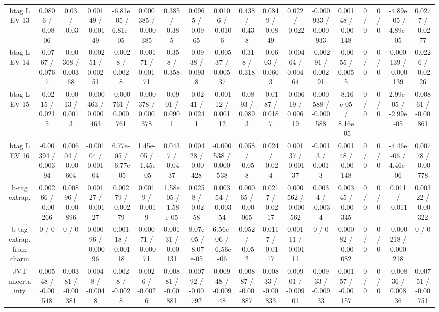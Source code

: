 \documentclass[10pt]{article}
\begin{document}
\begin{table}[htbp]
\begin{center}
\begin{tabular}{|c|c|c|c|c|c|c|c|c|c|c|c|c|c|c|c|c|c|}
  btag L EV 13 & 0.0806 / -0.0806 & 0.03 / -0.03 & 0.00149 / -0.00149 & -6.81e-05 / 6.81e-05 & 0.000385 / -0.000385 & 0.385 / -0.385 & 0.0965 / -0.0965 & 0.0106 / -0.0106 & 0.438 / -0.438 & 0.0849 / -0.0849 & 0.022 / -0.022 & -0.000933 / 0.000933 & 0.00148 / -0.00148 & 0 / 0 & 0 / 0 & -4.89e-05 / 4.89e-05 & 0.0277 / -0.0277 \\ 
  btag L EV 14 & -0.0767 / 0.0767 & -0.00368 / 0.00368 & -0.00251 / 0.00251 & -0.0028 / 0.0028 & -0.00171 / 0.00171 & -0.358 / 0.358 & -0.0938 / 0.0938 & -0.00537 / 0.00537 & -0.318 / 0.318 & -0.0603 / 0.0603 & -0.00464 / 0.00464 & -0.00291 / 0.00291 & -0.0055 / 0.0055 & 0 / 0 & 0 / 0 & 0.000139 / -0.000139 & 0.0226 / -0.0226 \\ 
  btag L EV 15 & -0.0215 / 0.0215 & -0.0013 / 0.0013 & -0.000463 / 0.000463 & -0.000761 / 0.000761 & -0.000378 / 0.000378 & -0.0901 / 0.0901 & -0.0241 / 0.0241 & -0.00112 / 0.00112 & -0.0893 / 0.0893 & -0.0187 / 0.0187 & -0.00619 / 0.00619 & 0.000588 / -0.000588 & -8.16e-05 / 8.16e-05 & 0 / 0 & 0 / 0 & 2.99e-05 / -2.99e-05 & 0.00861 / -0.00861 \\ 
  btag L EV 16 & -0.00394 / 0.00394 & 0.00604 / -0.00604 & -0.00104 / 0.00104 & 6.77e-05 / -6.77e-05 & 1.45e-05 / -1.45e-05 & 0.0437 / -0.0437 & 0.00428 / -0.00428 & -0.000538 / 0.000538 & 0.058 / -0.058 & 0.024 / -0.024 & 0.00137 / -0.00137 & -0.0013 / 0.0013 & 0.00148 / -0.00148 & 0 / 0 & 0 / 0 & -4.46e-06 / 4.46e-06 & 0.00778 / -0.00778 \\ 
  b-tag extrap. & 0.00266 / -0.00266 & 0.00896 / -0.00896 & 0.00127 / -0.00127 & 0.00279 / -0.00279 & 0.0019 / -0.0019 & 1.58e-05 / -1.58e-05 & 0.0258 / -0.0258 & 0.00354 / -0.00354 & 0.00065 / -0.00065 & 0.0217 / -0.0217 & 0.000562 / -0.000562 & 0.0034 / -0.0034 & 0.00345 / -0.00345 & 0 / 0 & 0 / 0 & 0.011 / -0.011 & 0.00322 / -0.00322 \\ 
  b-tag extrap. from charm & 0 / 0 & 0 / 0 & 0.00096 / -0.00096 & 0.00118 / -0.00118 & 0.00071 / -0.00071 & 0.00131 / -0.00131 & 8.07e-05 / -8.07e-05 & 6.56e-06 / -6.56e-06 & 0.052 / -0.052 & 0.0117 / -0.0117 & 0.00111 / -0.00111 & 0 / 0 & 0.00082 / -0.00082 & 0 / 0 & 0 / 0 & -0.000218 / 0.000218 & 0 / 0 \\ 
  JVT uncertainty & 0.00548 / -0.00548 & 0.00381 / -0.00381 & 0.0048 / -0.0048 & 0.0028 / -0.0028 & 0.0026 / -0.0026 & 0.00881 / -0.00881 & 0.00792 / -0.00792 & 0.00948 / -0.00948 & 0.00887 / -0.00887 & 0.00833 / -0.00833 & 0.00901 / -0.00901 & 0.00933 / -0.00933 & 0.00157 / -0.00157 & 0 / 0 & 0 / 0 & -0.00836 / 0.00836 & 0.00751 / -0.00751 \\ 

\end{tabular}
\end{center}
\end{table}
\end{document}
